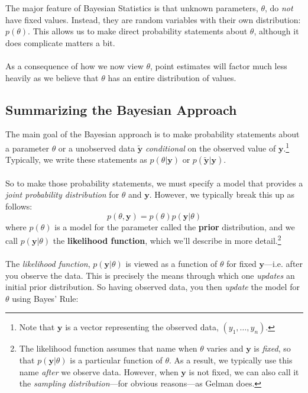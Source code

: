 \documentclass[12pt]{article}
\begin{document}
The major feature of Bayesian Statistics is that unknown parameters,
$\theta$, do \emph{not} have fixed values. Instead, they are random 
variables with their own distribution: $p(\theta)$. This allows us
to make direct probability statements about $\theta$, although it
does complicate matters a bit.
\\
\\
As a consequence of how we now view $\theta$, point estimates will
factor much less heavily as we believe that $\theta$ has an entire
distribution of values.

\subsection{Summarizing the Bayesian Approach}

The main goal of the Bayesian approach is to make probability statements
about a parameter $\theta$ or a unobserved data $\tilde{\mathbf{y}}$ 
\emph{conditional} on the observed value of $\mathbf{y}$.\footnote{Note 
that $\mathbf{y}$ is a vector representing the observed
data, $(y_1, \ldots, y_n)$.} Typically, we write these statements
as $p(\theta| \mathbf{y})$ or  $p(\tilde{\mathbf{y}}| \mathbf{y})$.
\\
\\
So to make those probability statements, we must specify a model that
provides a \emph{joint probability distribution} for $\theta$ and
$\mathbf{y}$. However, we typically break this up as follows:
   \[ p(\theta, \textbf{y}) = p(\theta) p(\mathbf{y} | \theta) \]
where $p(\theta)$ is a model for the parameter called the \textbf{prior}
distribution, and we call $p(\mathbf{y} | \theta)$ the \textbf{likelihood
function}, which we'll describe in more detail.\footnote{The 
   likelihood function assumes that name when $\theta$ varies and
   $\textbf{y}$ is \emph{fixed}, so that $p(\mathbf{y} | \theta)$ is
   a particular function of $\theta$.  As a result, we typically use 
   this name \emph{after} we observe data.  However, 
   when $\mathbf{y}$ is not fixed, we can also call it the 
   \emph{sampling distribution}---for obvious reasons---as Gelman does.}
\\
\\
The \emph{likelihood function}, $p(\mathbf{y} | \theta)$ is viewed
as a function of $\theta$ for fixed $\mathbf{y}$---i.e. after you observe
the data.  This is precisely the means through which one \emph{updates}
an initial prior distribution. So having observed data, 
you then \emph{update} the model for $\theta$ using Bayes' Rule:
\end{document}

